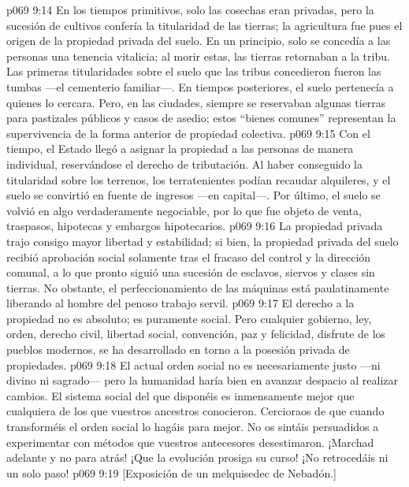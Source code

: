 \vs p069 9:14 En los tiempos primitivos, solo las cosechas eran privadas, pero la sucesión de cultivos confería la titularidad de las tierras; la agricultura fue pues el origen de la propiedad privada del suelo. En un principio, solo se concedía a las personas una tenencia vitalicia; al morir estas, las tierras retornaban a la tribu. Las primeras titularidades sobre el suelo que las tribus concedieron fueron las tumbas ---el cementerio familiar---. En tiempos posteriores, el suelo pertenecía a quienes lo cercara. Pero, en las ciudades, siempre se reservaban algunas tierras para pastizales públicos y casos de asedio; estos “bienes comunes” representan la supervivencia de la forma anterior de propiedad colectiva.
\vs p069 9:15 Con el tiempo, el Estado llegó a asignar la propiedad a las personas de manera individual, reservándose el derecho de tributación. Al haber conseguido la titularidad sobre los terrenos, los terratenientes podían recaudar alquileres, y el suelo se convirtió en fuente de ingresos ---en capital---. Por último, el suelo se volvió en algo verdaderamente negociable, por lo que fue objeto de venta, traspasos, hipotecas y embargos hipotecarios.
\vs p069 9:16 La propiedad privada trajo consigo mayor libertad y estabilidad; si bien, la propiedad privada del suelo recibió aprobación social solamente tras el fracaso del control y la dirección comunal, a lo que pronto siguió una sucesión de esclavos, siervos y clases sin tierras. No obstante, el perfeccionamiento de las máquinas está paulatinamente liberando al hombre del penoso trabajo servil.
\vs p069 9:17 El derecho a la propiedad no es absoluto; es puramente social. Pero cualquier gobierno, ley, orden, derecho civil, libertad social, convención, paz y felicidad, disfrute de los pueblos modernos, se ha desarrollado en torno a la posesión privada de propiedades.
\vs p069 9:18 El actual orden social no es necesariamente justo ---ni divino ni sagrado--- pero la humanidad haría bien en avanzar despacio al realizar cambios. El sistema social del que disponéis es inmensamente mejor que cualquiera de los que vuestros ancestros conocieron. Cercioraos de que cuando transforméis el orden social lo hagáis para mejor. No os sintáis persuadidos a experimentar con métodos que vuestros antecesores desestimaron. ¡Marchad adelante y no para atrás! ¡Que la evolución prosiga su curso! ¡No retrocedáis ni un solo paso!
\vsetoff
\vs p069 9:19 [Exposición de un melquisedec de Nebadón.]
